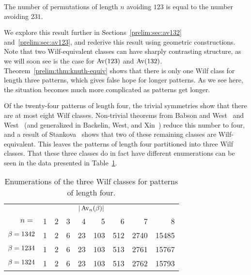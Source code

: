     \begin{theorem}
    \label{prelim:thm:knuth-equiv}
      The number of permutations of length $n$ avoiding $123$ is equal to the number
      avoiding $231$. 
    \end{theorem}

    We explore this result further in Sections~\ref{prelim:sec:av132}
    and~\ref{prelim:sec:av123}, and rederive this result using geometric
    constructions. Note that two Wilf-equivalent classes can have sharply
    contrasting structure, as we will soon see is the case for $\operatorname{{Av}}(123)$ and
    $\operatorname{{Av}}(132)$. 
    Theorem~\ref{prelim:thm:knuth-equiv} shows that there is only one Wilf
    class for length three patterns, which gives false hope for longer
    patterns.
    As we see here, the situation becomes much more complicated as patterns get
    longer. 

    Of the twenty-four patterns of length four, the trivial symmetries show
    that there are at most eight Wilf classes. 
    Non-trivial theorems from Babson and West~\cite{BabsonWest} and
    West~\cite{WestDiss} (and generalized in Backelin, West, and
    Xin~\cite{Backelin2007}) reduce this number to four, and 
    a result of Stankova~\cite{Stankova1994} shows that two of these
    remaining classes are Wilf-equivalent. This leaves the patterns of length
    four partitioned into three Wilf classes. That these three classes do in
    fact have different enumerations can be seen in the data presented in
    Table~\ref{prelim:tab:four-classes}. 

    \begin{table}[t] \centering
      \caption{Enumerations of the three Wilf classes for patterns of length
      four.}
      \label{prelim:tab:four-classes}
      \begin{tabular}{rrrrrrrrr}
      \multicolumn{9}{c}{$|\operatorname{{Av}}_n(\beta)|$} \\ 
       $n = $ & 1  & 2 & 3 & 4  & 5 & 6 & 7 & 8
        \\ \hline
      $\beta = 1342$ &
        1 & 2 & 6 & 23 & 103 & 512 & 2740 & 15485 \\
      $\beta = 1234$ &
        1 & 2 & 6 & 23 & 103 & 513 & 2761 & 15767 \\
      $\beta = 1324$ &
        1 & 2 & 6 & 23 & 103 & 513 & 2762 & 15793 \\
      \end{tabular}
    \end{table}


